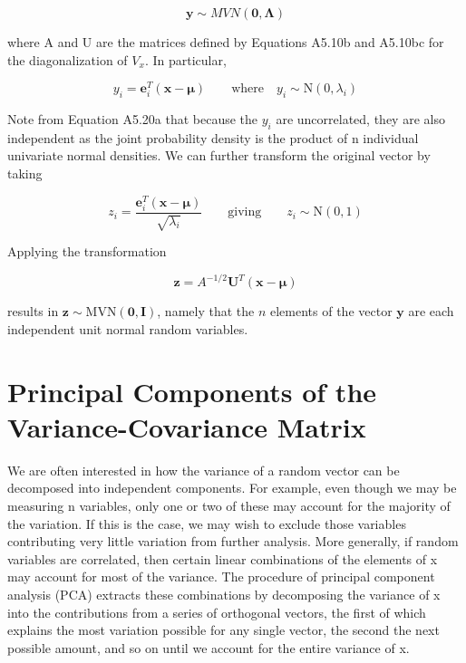 \documentclass{article}
\begin{document}
\begin{equation}
\mathbf{y}\sim MVN(\mathbf{0},\boldsymbol{\Lambda})
\end{equation}

where A and U are the matrices defined by Equations A5.10b and A5.10bc for the diagonalization of  $ V_x $. In particular,

\begin{equation}
y_{i}=\mathbf{e}_{i}^{T}(\mathbf{x}-\boldsymbol{\mu})\qquad\mathrm{w h e r e}\quad y_{i}\sim\mathrm{N}(0,\lambda_{i})
\end{equation}

Note from Equation A5.20a that because the  $ y_{i} $ are uncorrelated, they are also independent as the joint probability density is the product of n individual univariate normal densities. We can further transform the original vector by taking

\begin{equation}
z_{i}=\frac{\mathbf{e}_{i}^{T}(\mathbf{x}-\boldsymbol{\mu})}{\sqrt{\lambda_{i}}}\qquad\mathrm{g i v i n g}\qquad z_{i}\sim\mathrm{N}(0,1)
\end{equation}

Applying the transformation

\begin{equation}
\mathbf{z}=A^{-1/2}\mathbf{U}^{T}(\mathbf{x}-\boldsymbol{\mu})
\end{equation}

results in  $  \mathbf{z} \sim \text{MVN}(\mathbf{0}, \mathbf{I})  $, namely that the  $  n  $ elements of the vector  $  \mathbf{y}  $ are each independent unit normal random variables.

\section{Principal Components of the Variance-Covariance Matrix}
We are often interested in how the variance of a random vector can be decomposed into independent components. For example, even though we may be measuring n variables, only one or two of these may account for the majority of the variation. If this is the case, we may wish to exclude those variables contributing very little variation from further analysis. More generally, if random variables are correlated, then certain linear combinations of the elements of x may account for most of the variance. The procedure of principal component analysis (PCA) extracts these combinations by decomposing the variance of x into the contributions from a series of orthogonal vectors, the first of which explains the most variation possible for any single vector, the second the next possible amount, and so on until we account for the entire variance of x.
\end{document}
